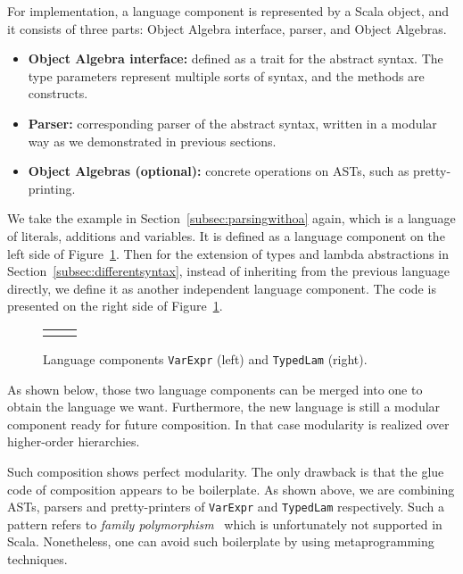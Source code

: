 For implementation, a language component is represented by a Scala object, and it consists of three parts: Object Algebra interface, parser, and Object Algebras.

\begin{itemize}
    \item \textbf{Object Algebra interface:} defined as a trait for the abstract syntax. The type parameters represent multiple sorts of syntax, and the methods are constructs.
    \item \textbf{Parser:} corresponding parser of the abstract syntax, written in a modular way as we demonstrated in previous sections.
    \item \textbf{Object Algebras (optional):} concrete operations on ASTs, such as pretty-printing.
\end{itemize}

We take the example in Section~\ref{subsec:parsingwithoa} again, which is a language of literals, additions and variables. It is defined as a
language component on the left side of Figure~\ref{fig:lng-components}.
Then for the extension of types and lambda abstractions in Section~\ref{subsec:differentsyntax}, instead of inheriting from the previous language directly, we define it as another independent language component. The code is presented on the right side of Figure~\ref{fig:lng-components}.

\begin{figure}[t]
\begin{tabular}{m{0.42\linewidth}m{0.52\linewidth}}
&
\end{tabular}
\caption{Language components \lstinline{VarExpr} (left) and \lstinline{TypedLam} (right).}\label{fig:lng-components}
\end{figure}

As shown below, those two language components can be merged into one to obtain the language we want. Furthermore, the new language is still a modular
component ready for future composition. In that case modularity is realized over higher-order hierarchies.

Such composition shows perfect modularity. The only
drawback is that the glue code of composition appears to be boilerplate. As shown above, we are combining ASTs, parsers and pretty-printers of
\lstinline{VarExpr} and \lstinline{TypedLam} respectively. Such a pattern refers to \textit{family polymorphism}~\cite{ernst01FP} which is unfortunately not supported in Scala. Nonetheless, one can avoid such boilerplate by using metaprogramming techniques.

